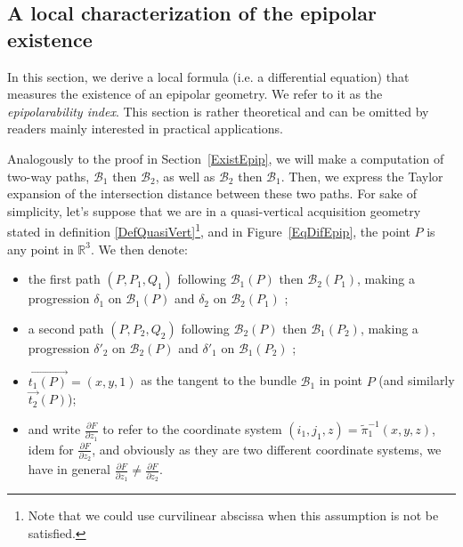 \documentclass{ipol}
\newcommand{\RR}{\ensuremath{\mathbb{R}}}
\newcommand{\Bund}[1]{\ensuremath{\mathcal{B}_{#1}}}
\newcommand{\BundO}{\Bund{1}}
\newcommand{\BundT}{\Bund{2}}
\newcommand{\PiVert}{\widetilde{\pi}}
\newcommand{\DerPart}[2]{\frac{\partial #1}{\partial #2}}
\newcommand{\er}[1]{\textcolor{orange}{#1}}
\begin{document}


\subsection{A local characterization of the epipolar existence}

In this section, we derive a local formula (i.e. a differential equation) that measures
the existence of an epipolar geometry. We refer to it as the \textit{epipolarability index}. This section is rather theoretical and
can be omitted by readers mainly interested in practical applications.

Analogously to the proof in Section~\ref{ExistEpip}, we will make a  computation of two-way paths, $\BundO$ then $\BundT$,
as well as $\BundT$ then  $\BundO$. Then, we express the Taylor expansion
of the intersection distance between these two paths. For sake of simplicity, let's suppose that we are in a quasi-vertical acquisition geometry stated in definition \ref{DefQuasiVert}\footnote{Note that we could use
          curvilinear abscissa  when this assumption is not be satisfied.}, and in Figure~\ref{EqDifEpip}, the point $P$ is any point in $\RR^3$. We then denote:
\begin{itemize}
   \item the first path $(P,P_1,Q_1)$ following  $\BundO(P)$ then $\BundT(P_1)$, making a
         progression $\delta_1$ on $\BundO(P)$ and  $\delta_2$ on $\BundT(P_1)$ ;
   \item a second path $(P,P_2,Q_2)$ following  $\BundT(P)$ then $\BundO(P_2)$, making a
         progression $\delta'_2$ on $\BundT(P)$ and  $\delta'_1$ on $\BundO(P_2)$ ;
   \item $\overrightarrow{t_1(P)}=(x,y,1)$ as the tangent to the bundle  $\BundO$  in point $P$
         (and similarly $\overrightarrow{t_2}(P)$);
   \item and write  $\DerPart{F}{z_1}$ to refer to the coordinate system $(i_1,j_1,z) = \PiVert_1^{-1}(x,y,z)$,
         idem for  $\DerPart{F}{z_2}$, and obviously as they are two different coordinate systems, we have in general
        $\DerPart{F}{z_1}  \neq \DerPart{F}{z_2}$.
\end{itemize}
\end{document}
